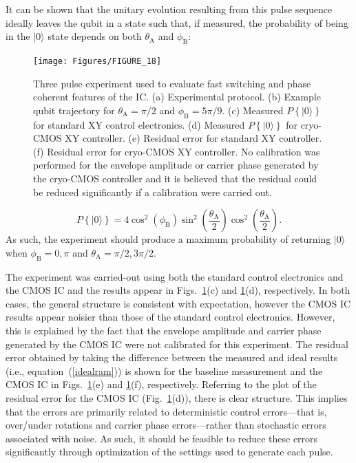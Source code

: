 \documentclass[journal]{IEEEtran}
\newcommand{\CR}[1]{{\color{black}#1}}
\begin{document}
It can be shown that the unitary evolution \CR{resulting} from this pulse sequence ideally leaves the qubit in a state such that, if measured, the probability of being in the $|0\rangle$ state depends on both $\theta_\text{A}$ and $\phi_\text{B}$:  
\begin{figure}[bt!]
\texttt{[image: Figures/FIGURE\_18]}
\caption{Three pulse experiment used to evaluate fast switching and phase coherent features of the IC. (a) Experimental protocol. (b) Example qubit trajectory for $\theta_\text{A}=\pi/2$ and $\phi_\text{B}=5\pi/9$. (c) Measured $P\left\{|0\rangle\right\}$ for standard XY control electronics. (d) Measured $P\left\{|0\rangle\right\}$ for cryo-CMOS XY controller. (e) Residual error for standard XY controller. (f) Residual error for cryo-CMOS XY controller. No calibration was performed for the envelope amplitude or carrier phase generated by the cryo-CMOS controller and it is believed that the residual could be  reduced significantly if a calibration were carried out.}
\label{Ramsey}
\end{figure}
\begin{equation}
P\left\{|0\rangle\right\}=4\cos^2\left(\phi_\text{B}\right)\sin^2\left(\frac{\theta_\text{A}}{2}\right)\cos^2\left(\frac{\theta_\text{A}}{2}\right).\label{idealram}
\end{equation}
As such, the experiment should produce a maximum probability of returning $|0\rangle$ when $\phi_\text{B}=0,\pi$ and $\theta_\text{A}=\pi/2,3\pi/2$.

The experiment was carried-out using both the standard control electronics and the CMOS IC and the results appear in Figs.~\ref{Ramsey}(c) and \ref{Ramsey}(d), respectively. In both cases, the general structure is consistent with expectation, however the CMOS IC results appear noisier than those of the standard control electronics. However, this is explained by the fact that the envelope amplitude and carrier phase generated by the CMOS IC were not calibrated for this experiment. The residual error obtained by taking the difference between the measured and ideal results (i.e., equation~(\ref{idealram})) is shown for the baseline measurement and the CMOS IC in Figs.~\ref{Ramsey}(e) and \ref{Ramsey}(f), respectively. \CR{Referring to the plot of the residual error for the CMOS IC (Fig.~\ref{Ramsey}(d)), there is clear structure. This implies that the errors are primarily related to deterministic control errors---that is, over/under rotations and carrier phase errors---rather than stochastic errors associated with noise. As such, it should be feasible to reduce these errors significantly through optimization of the settings used to generate each pulse.}
\end{document}

